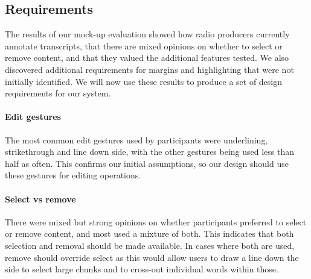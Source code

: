 

\subsection{Requirements}

The results of our mock-up evaluation showed how radio producers currently annotate transcripts, that there are mixed
opinions on whether to select or remove content, and that they valued the additional features tested.  We also
discovered additional requirements for margins and highlighting that were not initially identified.  We will now use
these results to produce a set of design requirements for our system.

\paragraph{Edit gestures}
The most common edit gestures used by participants were underlining, strikethrough and line down side, with the other
gestures being used less than half as often.  This confirms our initial assumptions, so our design should use these
gestures for editing operations.

\paragraph{Select vs remove}
There were mixed but strong opinions on whether participants preferred to select or remove content, and most used a
mixture of both.  This indicates that both selection and removal should be made available. In cases where both are
used, remove should override select as this would allow users to draw a line down the side to select large chunks and 
to cross-out individual words within those.

